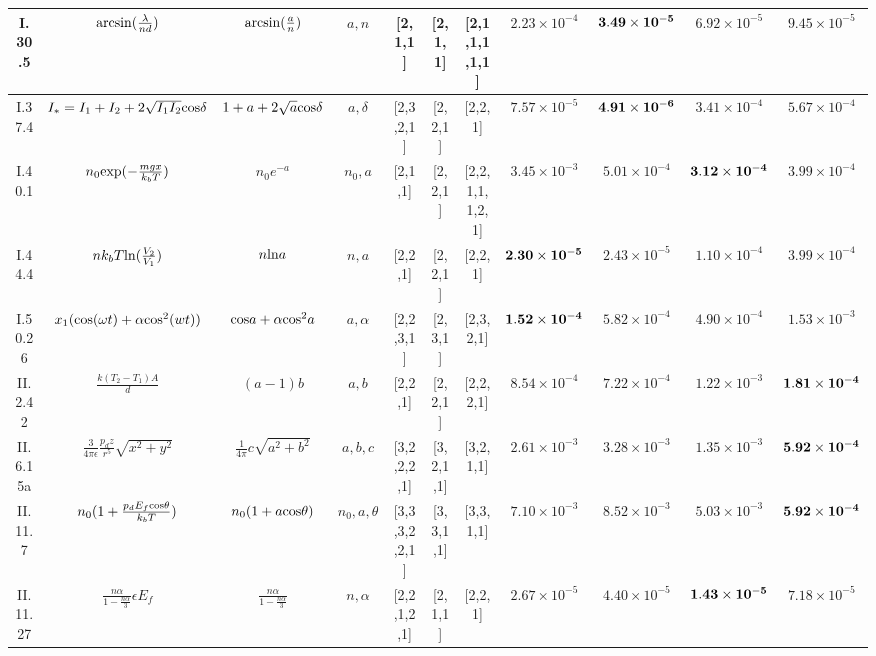 \documentclass{article}
\numberwithin{equation}{section}
\numberwithin{figure}{section}
\begin{document}
\begin{table}[t]
{\begin{tabular}{|c|c|c|c|c|c|c|c|c|c|c|}
    I.30.5 & ${\rm arcsin}(\frac{\lambda}{nd})$ & ${\rm arcsin}(\frac{a}{n})$ & $a,n$ & [2,1,1]  & [2,1,1] & [2,1,1,1,1,1] & $2.23\times 10^{-4}$ & ${\bf 3.49\times 10^{-5}}$ & $6.92\times 10^{-5}$ & $9.45\times 10^{-5}$ \\\hline
    I.37.4 & $I_*=I_1+I_2+2\sqrt{I_1I_2}{\rm cos}\delta$ & $1+a+2\sqrt{a}{\rm cos}\delta$ & $a,\delta$ & [2,3,2,1]  & [2,2,1] & [2,2,1] & $7.57\times 10^{-5}$ & ${\bf 4.91\times 10^{-6}}$ & $3.41\times 10^{-4}$ & $5.67\times 10^{-4}$ \\\hline
    I.40.1 & $n_0{\rm exp}(-\frac{mgx}{k_bT})$ & $n_0e^{-a}$ & $n_0,a$ & [2,1,1]  & [2,2,1] & [2,2,1,1,1,2,1] & $3.45\times 10^{-3}$ & $5.01\times 10^{-4}$ & ${\bf 3.12\times 10^{-4}}$ & $3.99\times 10^{-4}$ \\\hline
    I.44.4 & $nk_bT{\rm ln}(\frac{V_2}{V_1})$ & $n{\rm ln}a$ & $n,a$ &  [2,2,1]  & [2,2,1] & [2,2,1] & ${\bf 2.30\times 10^{-5}}$ & $2.43\times 10^{-5}$ & $1.10\times 10^{-4}$ & $3.99\times 10^{-4}$ \\\hline
    I.50.26 & $x_1({\rm cos}(\omega t)+\alpha {\rm cos}^2(wt))$ & ${\rm cos}a+\alpha{\rm cos}^2a$ & $a,\alpha$ &  [2,2,3,1]   & [2,3,1] & [2,3,2,1] & ${\bf 1.52\times 10^{-4}}$ & $5.82\times 10^{-4}$ & $4.90\times 10^{-4}$ & $1.53\times 10^{-3}$ \\\hline
    II.2.42 & $\frac{k(T_2-T_1)A}{d}$ & $(a-1)b$ & $a,b$ &  [2,2,1]  & [2,2,1] & [2,2,2,1] & $8.54\times 10^{-4}$ & $7.22\times 10^{-4}$ & $1.22\times 10^{-3}$ & ${\bf 1.81\times 10^{-4}}$ \\\hline
    II.6.15a & $\frac{3}{4\pi\epsilon}\frac{p_dz}{r^5}\sqrt{x^2+y^2}$ & $\frac{1}{4\pi} c\sqrt{a^2+b^2}$ & $a,b,c$ & [3,2,2,2,1]  & [3,2,1,1] & [3,2,1,1] & $2.61\times 10^{-3}$ &$3.28\times 10^{-3}$ & $1.35\times 10^{-3}$ & ${\bf 5.92\times 10^{-4}}$ \\\hline
    II.11.7 & $n_0(1+\frac{p_dE_f{\rm cos}\theta}{k_bT})$ & $n_0(1+a{\rm cos}\theta)$ & $n_0, a, \theta$ & [3,3,3,2,2,1]  & [3,3,1,1] & [3,3,1,1] & $7.10\times 10^{-3}$ & $8.52\times 10^{-3}$ & $5.03\times 10^{-3}$  & ${\bf 5.92\times 10^{-4}}$ \\\hline
    II.11.27 & $\frac{n\alpha}{1-\frac{n\alpha}{3}}\epsilon E_f$ & $\frac{n\alpha}{1-\frac{n\alpha}{3}}$ & $n,\alpha$ &  [2,2,1,2,1]  & [2,1,1] & [2,2,1] & $2.67\times 10^{-5}$ & $4.40\times 10^{-5}$ & ${\bf 1.43\times 10^{-5}}$ & $7.18\times 10^{-5}$ \\\hline

\end{tabular}}
\end{table}
\end{document}
